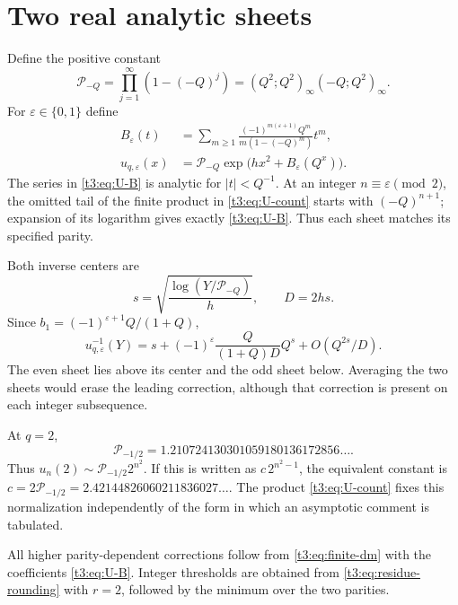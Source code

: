 \documentclass[11pt,openany]{book}
\numberwithin{equation}{chapter}
\theoremstyle{plain}
\theoremstyle{definition}
\theoremstyle{remark}
\newcommand{\eps}{\varepsilon}
\begin{document}
\section{Two real analytic sheets}

Define the positive constant
\begin{equation}\label{t3:eq:Pminus}
 \mathcal P_{-Q}=\prod_{j=1}^{\infty}(1-(-Q)^j)
 =(Q^2;Q^2)_\infty(-Q;Q^2)_\infty.
\end{equation}
For $\eps\in\{0,1\}$ define
\begin{align}
 B_{\eps}(t)&=\sum_{m\ge1}
 \frac{(-1)^{m(\eps+1)}Q^m}{m(1-(-Q)^m)}t^m,
 \label{t3:eq:U-B}\\
 u_{q,\eps}(x)&=\mathcal P_{-Q}
                  \exp\bigl(hx^2+B_{\eps}(Q^x)\bigr).
 \label{t3:eq:U-sheet}
\end{align}
The series in \eqref{t3:eq:U-B} is analytic for $|t|<Q^{-1}$. At an integer $n\equiv\eps\pmod2$, the omitted tail of the finite product in \eqref{t3:eq:U-count} starts with $(-Q)^{n+1}$; expansion of its logarithm gives exactly \eqref{t3:eq:U-B}. Thus each sheet matches its specified parity.

Both inverse centers are
\begin{equation}\label{t3:eq:U-center}
 s=\sqrt{\frac{\log(Y/\mathcal P_{-Q})}h},\qquad D=2hs.
\end{equation}
Since $b_1=(-1)^{\eps+1}Q/(1+Q)$,
\begin{equation}\label{t3:eq:U-first}
 u_{q,\eps}^{-1}(Y)
 =s+(-1)^{\eps}\frac{Q}{(1+Q)D}Q^s+O(Q^{2s}/D).
\end{equation}
The even sheet lies above its center and the odd sheet below. Averaging the two sheets would erase the leading correction, although that correction is present on each integer subsequence.

At $q=2$,
\begin{equation}\label{t3:eq:U-constant-check}
 \mathcal P_{-1/2}=1.210724130301059180136172856\ldots.
\end{equation}
Thus $u_n(2)\sim\mathcal P_{-1/2}2^{n^2}$. If this is written as
$c\,2^{n^2-1}$, the equivalent constant is
$c=2\mathcal P_{-1/2}=2.42144826060211836027\ldots$.
The product \eqref{t3:eq:U-count} fixes this normalization independently of the form in which an asymptotic comment is tabulated.

All higher parity-dependent corrections follow from \eqref{t3:eq:finite-dm} with the coefficients \eqref{t3:eq:U-B}. Integer thresholds are obtained from \eqref{t3:eq:residue-rounding} with $r=2$, followed by the minimum over the two parities.
\end{document}
